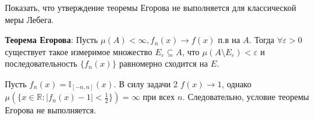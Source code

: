 \begin{task}{6}
Показать, что утверждение теоремы Егорова не выполняется для классической меры Лебега.
\end{task}

\begin{solution}
\textbf{Теорема Егорова}: Пусть $\mu(A) < \infty, f_n(x) \to f(x)$ п.в на $A$. Тогда $\forall \varepsilon > 0$ существует такое измеримое множество $E_{\varepsilon} \subseteq A$, что $\mu(A \setminus E_{\varepsilon}) < \varepsilon$ и последовательность $\{f_n(x)\}$ равномерно сходится на $E$.

Пусть $f_n(x) = \mathbb{I}_{[-n, n]}(x)$. В силу задачи 2 $f(x) \to 1$, однако $\mu(\{x \in \mathbb{R}: |f_n(x) - 1| < \frac{1}{2}\}) = \infty$ при всех $n$. Следовательно, условие теоремы Егорова не выполняется.
\end{solution}